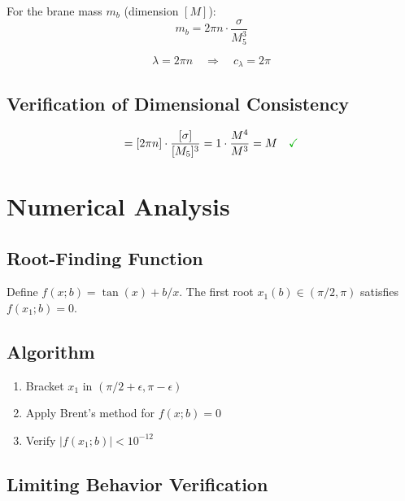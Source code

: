 \documentclass[11pt,a4paper]{article}
\newcommand{\Mfive}{M_5}
\newcommand{\mb}{m_b}
\newcommand{\emark}{\textcolor{green!70!black}{\checkmark}}
\theoremstyle{definition}
\theoremstyle{plain}
\theoremstyle{remark}
\begin{document}
For the brane mass $\mb$ (dimension $[M]$):
\begin{equation}
\mb = 2\pi n \cdot \frac{\sigma}{\Mfive^3}
\label{eq:mb-2pi}
\end{equation}

\begin{equation}
\boxed{\lambda = 2\pi n \quad \Rightarrow \quad c_\lambda = 2\pi}
\label{eq:lambda-2pi}
\end{equation}

\subsection{Verification of Dimensional Consistency}

\begin{equation}
[\mb] = [2\pi n] \cdot \frac{[\sigma]}{[\Mfive]^3} = 1 \cdot \frac{M^4}{M^3} = M \quad \emark
\label{eq:dim-check}
\end{equation}

\section{Numerical Analysis}
\label{sec:numerical}

\subsection{Root-Finding Function}

Define $f(x; b) = \tan(x) + b/x$. The first root $x_1(b) \in (\pi/2, \pi)$
satisfies $f(x_1; b) = 0$.

\subsection{Algorithm}

\begin{enumerate}
\item Bracket $x_1$ in $(\pi/2 + \epsilon, \pi - \epsilon)$
\item Apply Brent's method for $f(x; b) = 0$
\item Verify $|f(x_1; b)| < 10^{-12}$
\end{enumerate}

\subsection{Limiting Behavior Verification}
\end{document}
